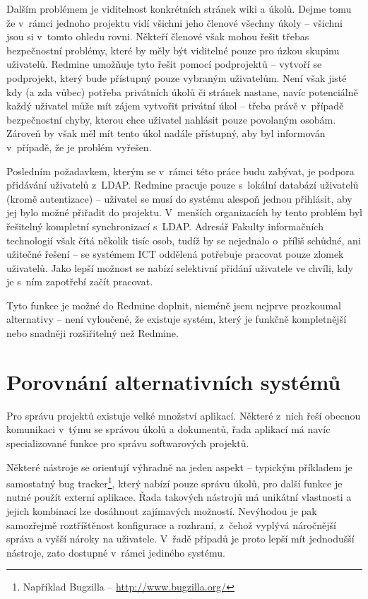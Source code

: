 \documentclass[thesis=B,czech]{FITthesis}[2012/05/02]
\begin{document}
Dalším problémem je viditelnost konkrétních stránek wiki a úkolů. Dejme
tomu že v~rámci jednoho projektu vidí všichni jeho členové všechny
úkoly -- všichni jsou si v~tomto ohledu rovni. Někteří
členové však mohou řešit třebas bezpečnostní problémy,
které by měly být viditelné pouze pro úzkou skupinu uživatelů. Redmine
umožňuje tyto  řešit pomocí podprojektů --
vytvoří se podprojekt, který bude přístupný pouze vybraným uživatelům.
Není však jisté kdy (a zda vůbec) potřeba privátních úkolů či stránek
nastane, navíc potenciálně každý uživatel může mít zájem vytvořit
privátní úkol -- třeba právě v~případě bezpečnostní chyby, kterou chce
uživatel nahlásit pouze povolaným osobám. Zároveň by však měl mít tento
úkol nadále přístupný, aby byl informován v~případě, že je problém
vyřešen.

Posledním požadavkem, kterým se v~rámci této práce budu zabývat, je
podpora přidávání uživatelů z~\gls{LDAP}. Redmine
pracuje pouze s~lokální databází uživatelů (kromě autentizace) -- uživatel se musí do
systému alespoň jednou přihlásit, aby jej bylo možné přiřadit do
projektu. V~menších organizacích by tento problém byl řešitelný
kompletní synchronizací s~\gls{LDAP}. Adresář Fakulty informačních
technologií však čítá několik tisíc osob, tudíž by se nejednalo o~příliš
schůdné, ani užitečné řešení -- se systémem ICT oddělená potřebuje
pracovat pouze zlomek uživatelů. Jako lepší možnost se nabízí selektivní
přidání uživatele ve chvíli, kdy je s~ním zapotřebí začít pracovat.

Tyto funkce je možné do Redmine doplnit, nicméně jsem nejprve prozkoumal
alternativy -- není vyloučené, že existuje systém, který je funkčně
kompletnější nebo snadněji rozšiřitelný než Redmine.

\chapter{Porovnání alternativních systémů}

Pro správu projektů existuje velké množství aplikací. Některé z~nich
řeší obecnou komunikaci v~týmu se správou úkolů a dokumentů, řada
aplikací má navíc specializované funkce pro správu softwarových
projektů.

Některé nástroje se orientují výhradně na jeden aspekt -- typickým
příkladem je samostatný \gls{bug tracker}\footnote{Například Bugzilla --
  \url{http://www.bugzilla.org/}}, který nabízí pouze správu úkolů, pro
další funkce je nutné použít externí aplikace. Řada takových nástrojů má
unikátní vlastnosti a jejich kombinací lze dosáhnout zajímavých
možností. Nevýhodou je pak samozřejmě roztříštěnost konfigurace a
rozhraní, z~čehož vyplývá náročnější správa a vyšší nároky na uživatele.
V~řadě případů je proto lepší mít jednodušší nástroje, zato dostupné
v~rámci jediného systému.
\end{document}
